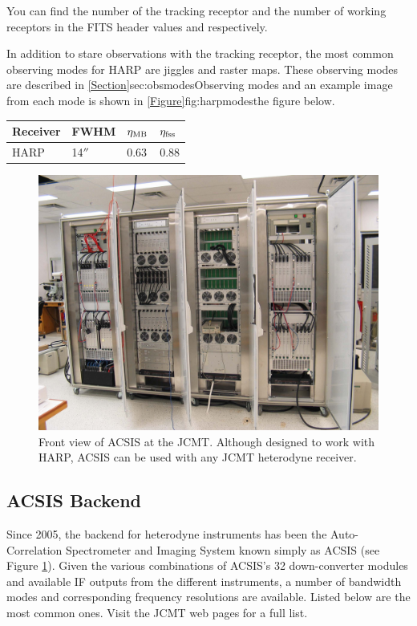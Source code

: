 \documentclass[11pt,oneside,chapters]{starlink}
\providecommand{\arcm}{\si{\arcminute}}%
\providecommand{\arcsec}{\si{\arcsecond}}%
\begin{document}
You can find the number of the tracking receptor and the number of
working receptors in the FITS header values  and
 respectively.

In addition to stare observations with the tracking receptor, the most
common observing modes for HARP are jiggles and raster maps. These
observing modes are described in
\cref{Section}{sec:obsmodes}{Observing modes} and an example image
from each mode is shown in \cref{Figure}{fig:harpmodes}{the figure
below}.

\begin{table}[h!]
\begin{center}
\begin{tabular}{|p{1.5cm}|p{1.2cm}|p{0.8cm}|p{0.8cm}|}
\hline
Receiver &FWHM & $\eta_\textnormal{MB}$ & $\eta_\textnormal{fss}$\\
\hline
HARP&14$\arcsec$ &0.63& 0.88\\
\hline
\end{tabular}
\end{center}
\end{table}


\begin{figure}[b!]
\begin{center}
\includegraphics[width=0.7\linewidth]{sc20_acsis_front_sm}
\caption[Front view of ACSIS at the JCMT]{Front view of ACSIS at the
JCMT. Although designed to work with HARP, ACSIS can be used with any
JCMT heterodyne receiver.}
\label{fig:acsis}
\end{center}
\end{figure}


\subsection{ACSIS Backend}

Since 2005, the backend for heterodyne instruments has been the
Auto-Correlation Spectrometer and Imaging System known simply as ACSIS
(see Figure \ref{fig:acsis}). Given the various combinations of
ACSIS's 32 down-converter modules and available IF outputs from the
different instruments, a number of bandwidth modes and corresponding
frequency resolutions are available. Listed below are the most common
ones. Visit the JCMT web pages for a full list.
\end{document}
